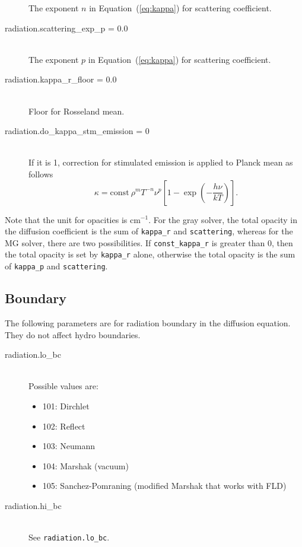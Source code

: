 \documentclass[11pt,letterpaper]{article}
\begin{document}
\begin{description}
  The exponent $n$ in Equation~(\ref{eq:kappa}) for scattering coefficient.
\item[radiation.scattering\_exp\_p = 0.0] \hfill \\
  The exponent $p$ in Equation~(\ref{eq:kappa}) for scattering coefficient.
\item[radiation.kappa\_r\_floor = 0.0] \hfill \\
  Floor for Rosseland mean.
\item[radiation.do\_kappa\_stm\_emission = 0] \hfill \\
  If it is 1, correction for stimulated emission is applied to Planck mean as
  follows
  \begin{equation}
    \kappa = \mathrm{const}\ \rho^{m} T^{-n} \nu^{p}
    [1-\exp{(-\frac{h\nu}{k T})}].
  \end{equation}
\end{description}

\noindent Note that the unit for opacities is $\mathrm{cm}^{-1}$.  For
the gray solver, the total opacity in the diffusion coefficient is the sum
of {\tt kappa\_r} and {\tt scattering}, whereas for the MG solver,
there are two possibilities.  If {\tt const\_kappa\_r} is greater than
0, then the total opacity is set by {\tt kappa\_r} alone, otherwise
the total opacity is the sum of {\tt kappa\_p} and {\tt scattering}. 

\subsection{Boundary}

The following parameters are for radiation boundary in the diffusion
equation. They do not affect hydro boundaries. 
\begin{description}
\item[radiation.lo\_bc] \hfill \\
  Possible values are:
  \begin{itemize}
    \item 101: Dirchlet
    \item 102: Reflect
    \item 103: Neumann
    \item 104: Marshak (vacuum) 
    \item 105: Sanchez-Pomraning (modified Marshak that works with FLD)
  \end{itemize}
\item[radiation.hi\_bc] \hfill \\
  See {\tt radiation.lo\_bc}.
\end{description}
\end{document}
